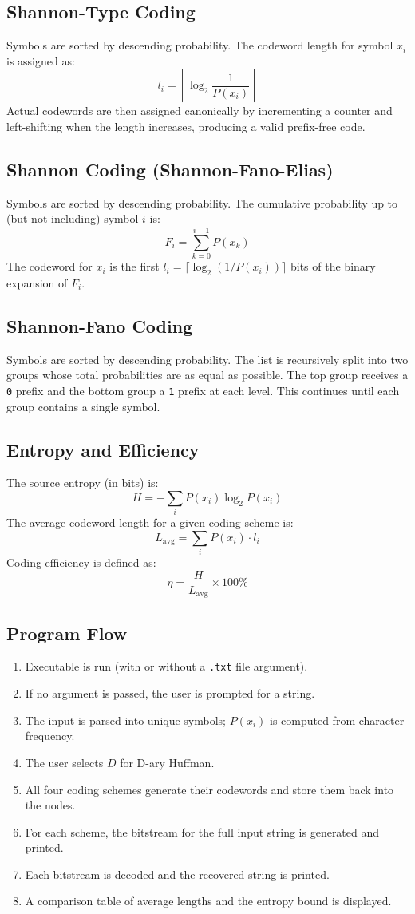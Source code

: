 \documentclass{AnantDocumentation}
\begin{document}
\subsection{Shannon-Type Coding}
Symbols are sorted by descending probability. The codeword length for symbol $x_i$ is assigned as:
\[
	l_i = \left\lceil \log_2 \frac{1}{P(x_i)} \right\rceil
\]
Actual codewords are then assigned canonically by incrementing a counter and left-shifting when the length increases, producing a valid prefix-free code.

\subsection{Shannon Coding (Shannon-Fano-Elias)}
Symbols are sorted by descending probability. The cumulative probability up to (but not including) symbol $i$ is:
\[
	F_i = \sum_{k=0}^{i-1} P(x_k)
\]
The codeword for $x_i$ is the first $l_i = \lceil \log_2(1/P(x_i)) \rceil$ bits of the binary expansion of $F_i$.

\subsection{Shannon-Fano Coding}
Symbols are sorted by descending probability. The list is recursively split into two groups whose total probabilities are as equal as possible. The top group receives a \texttt{0} prefix and the bottom group a \texttt{1} prefix at each level. This continues until each group contains a single symbol.

\subsection{Entropy and Efficiency}
The source entropy (in bits) is:
\[
	H = -\sum_{i} P(x_i) \log_2 P(x_i)
\]
The average codeword length for a given coding scheme is:
\[
	L_{\text{avg}} = \sum_{i} P(x_i) \cdot l_i
\]
Coding efficiency is defined as:
\[
	\eta = \frac{H}{L_{\text{avg}}} \times 100\%
\]

\subsection{Program Flow}
\begin{enumerate}
	\item Executable is run (with or without a \texttt{.txt} file argument).
	\item If no argument is passed, the user is prompted for a string.
	\item The input is parsed into unique symbols; $P(x_i)$ is computed from character frequency.
	\item The user selects $D$ for D-ary Huffman.
	\item All four coding schemes generate their codewords and store them back into the nodes.
	\item For each scheme, the bitstream for the full input string is generated and printed.
	\item Each bitstream is decoded and the recovered string is printed.
	\item A comparison table of average lengths and the entropy bound is displayed.
\end{enumerate}
\end{document}
